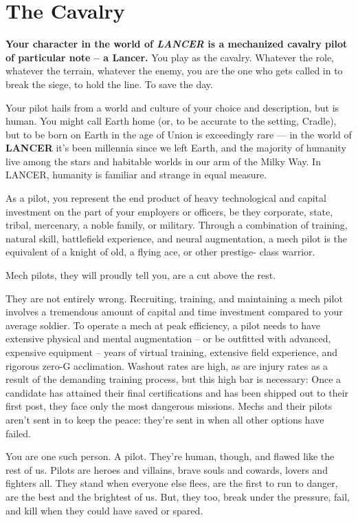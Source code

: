 \section{The Cavalry}

\textbf{Your character in the world of \textit{LANCER} is a mechanized cavalry pilot of particular note -- a
Lancer.} You play as the cavalry. Whatever the role, whatever the terrain, whatever the enemy,
you are the one who gets called in to break the siege, to hold the line. To save the day.

Your pilot hails from a world and culture of your choice and description, but is human. You might
call Earth home (or, to be accurate to the setting, Cradle), but to be born on Earth in the age of
Union is exceedingly rare — in the world of \textbf{LANCER} it's been millennia since we left Earth, and
the majority of humanity live among the stars and habitable worlds in our arm of the Milky Way.
In LANCER, humanity is familiar and strange in equal measure.

As a pilot, you represent the end product of heavy technological and capital investment on the
part of your employers or officers, be they corporate, state, tribal, mercenary, a noble family, or
military. Through a combination of training, natural skill, battlefield experience, and neural
augmentation, a mech pilot is the equivalent of a knight of old, a flying ace, or other prestige-
class warrior.

Mech pilots, they will proudly tell you, are a cut above the rest.

They are not entirely wrong. Recruiting, training, and maintaining a mech pilot involves a
tremendous amount of capital and time investment compared to your average soldier. To operate
a mech at peak efficiency, a pilot needs to have extensive physical and mental augmentation --
or be outfitted with advanced, expensive equipment -- years of virtual training, extensive field
experience, and rigorous zero-G acclimation. Washout rates are high, as are injury rates as a
result of the demanding training process, but this high bar is necessary: Once a candidate has
attained their final certifications and has been shipped out to their first post, they face only the
most dangerous missions. Mechs and their pilots aren't sent in to keep the peace: they're sent in
when all other options have failed.

You are one such person. A pilot. They're human, though, and flawed like the rest of us. Pilots
are heroes and villains, brave souls and cowards, lovers and fighters all. They stand when
everyone else flees, are the first to run to danger, are the best and the brightest of us. But, they
too, break under the pressure, fail, and kill when they could have saved or spared.


